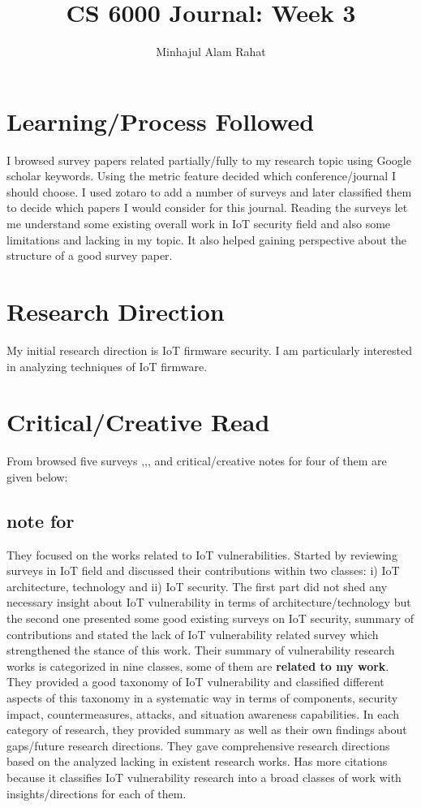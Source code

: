 \documentclass[fleqn,10pt]{olplainarticle}
\title{CS 6000 Journal: Week 3}
\author{Minhajul Alam Rahat}
\affil{University of Colorado Colorado Springs}
\affil{\textit{mrahat@uccs.edu}}
\begin{document}
\flushbottom
\maketitle
\thispagestyle{empty}

\section{Learning/Process Followed}

I browsed survey papers related partially/fully to my research topic using Google scholar keywords. Using the metric feature decided which conference/journal I should choose. I used zotaro to add a number of surveys and later classified them to decide which papers I would consider for this journal. Reading the surveys let me understand some existing overall work in IoT security field and also some limitations and lacking in my topic. It also helped gaining perspective about the structure of a good survey paper. 
 

\section{Research Direction}

My initial research direction is IoT firmware security. I am particularly interested in analyzing techniques of IoT firmware.


\section{Critical/Creative Read}
From browsed five surveys \cite{1},\cite{2},\cite{3},\cite{4} and \cite{5} critical/creative notes for four of them are given below:

\subsection{note for \cite{1}}

They focused on the works related to IoT vulnerabilities. Started by reviewing surveys in IoT field and discussed their contributions within two classes: i) IoT architecture, technology and ii) IoT security. The first part did not shed any necessary insight about IoT vulnerability in terms of architecture/technology but the second one presented some good existing surveys on IoT security, summary of contributions and stated the lack of IoT vulnerability related survey which strengthened the stance of this work.  Their summary of vulnerability research works is categorized in nine classes, some of them are \textbf{related to my work}. They provided a good taxonomy of IoT vulnerability and classified different aspects of this taxonomy in a systematic way in terms of components, security impact, countermeasures, attacks, and situation awareness capabilities. In each category of research, they provided summary as well as their own findings about gaps/future research directions. They gave comprehensive research directions based on the analyzed lacking in existent research works. Has more citations because it classifies IoT vulnerability research into a broad classes of work with insights/directions for each of them. 
\end{document}
